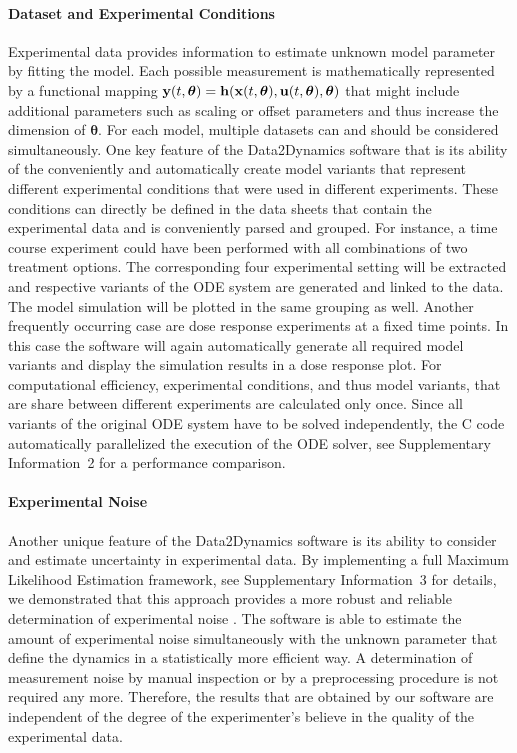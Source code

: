 \documentclass{bioinfo}
\begin{document}
\paragraph{Dataset and Experimental Conditions}
Experimental data provides information to estimate unknown model parameter by fitting the model. Each possible measurement is mathematically represented by a functional mapping
${\bf y}(t,{\boldsymbol \theta}) = {\bf h}({\bf x}(t,{\boldsymbol \theta}),{\bf u}(t,{\boldsymbol \theta}),{\boldsymbol \theta})$
that might include additional parameters such as scaling or offset parameters and thus increase the dimension of ${\boldsymbol \theta}$. For each model, multiple datasets can and should be considered simultaneously. One key feature of the Data2Dynamics software that is its ability of the conveniently and automatically create model variants that represent different experimental conditions that were used in different experiments. These conditions can directly be defined in the data sheets that contain the experimental data and is conveniently parsed and grouped. For instance, a time course experiment could have been performed with all combinations of two treatment options. The corresponding four experimental setting will be extracted and respective variants of the ODE system are generated and linked to the data. The model simulation will be plotted in the same grouping as well. Another frequently occurring case are dose response experiments at a fixed time points. In this case the software will again automatically generate all required model variants and display the simulation results in a dose response plot. For computational efficiency, experimental conditions, and thus model variants, that are share between different experiments are calculated only once. Since all variants of the original ODE system have to be solved independently, the C code automatically parallelized the execution of the ODE solver, see Supplementary Information~2 for a performance comparison. 

\paragraph{Experimental Noise}
Another unique feature of the Data2Dynamics software is its ability to consider and estimate uncertainty in experimental data. By implementing a full Maximum Likelihood Estimation framework, see Supplementary Information~3 for details, we demonstrated that this approach provides a more robust and reliable determination of experimental noise \citep{Raue:2012zt}. The software is able to estimate the amount of experimental noise simultaneously with the unknown parameter that define the dynamics in a statistically more efficient way. A determination of measurement noise by manual inspection or by a preprocessing procedure is not required any more. Therefore, the results that are obtained by our software are independent of the degree of the experimenter's believe in the quality of the experimental data.
\end{document}

